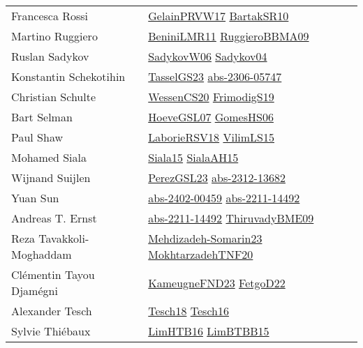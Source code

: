 {\begin{longtable}{p{4cm}p{20cm}}
Francesca Rossi & \href{papers/GelainPRVW17.pdf}{GelainPRVW17}\cite{GelainPRVW17} \href{articles/BartakSR10.pdf}{BartakSR10}\cite{BartakSR10} \\
Martino Ruggiero & \href{articles/BeniniLMR11.pdf}{BeniniLMR11}\cite{BeniniLMR11} \href{articles/RuggieroBBMA09.pdf}{RuggieroBBMA09}\cite{RuggieroBBMA09} \\
Ruslan Sadykov & \href{}{SadykovW06}\cite{SadykovW06} \href{papers/Sadykov04.pdf}{Sadykov04}\cite{Sadykov04} \\
Konstantin Schekotihin & \href{papers/TasselGS23.pdf}{TasselGS23}\cite{TasselGS23} \href{articles/abs-2306-05747.pdf}{abs-2306-05747}\cite{abs-2306-05747} \\
Christian Schulte & \href{papers/WessenCS20.pdf}{WessenCS20}\cite{WessenCS20} \href{papers/FrimodigS19.pdf}{FrimodigS19}\cite{FrimodigS19} \\
Bart Selman & \href{papers/HoeveGSL07.pdf}{HoeveGSL07}\cite{HoeveGSL07} \href{papers/GomesHS06.pdf}{GomesHS06}\cite{GomesHS06} \\
Paul Shaw & \href{articles/LaborieRSV18.pdf}{LaborieRSV18}\cite{LaborieRSV18} \href{papers/VilimLS15.pdf}{VilimLS15}\cite{VilimLS15} \\
Mohamed Siala & \href{articles/Siala15.pdf}{Siala15}\cite{Siala15} \href{papers/SialaAH15.pdf}{SialaAH15}\cite{SialaAH15} \\
Wijnand Suijlen & \href{papers/PerezGSL23.pdf}{PerezGSL23}\cite{PerezGSL23} \href{articles/abs-2312-13682.pdf}{abs-2312-13682}\cite{abs-2312-13682} \\
Yuan Sun & \href{articles/abs-2402-00459.pdf}{abs-2402-00459}\cite{abs-2402-00459} \href{articles/abs-2211-14492.pdf}{abs-2211-14492}\cite{abs-2211-14492} \\
Andreas T. Ernst & \href{articles/abs-2211-14492.pdf}{abs-2211-14492}\cite{abs-2211-14492} \href{papers/ThiruvadyBME09.pdf}{ThiruvadyBME09}\cite{ThiruvadyBME09} \\
Reza Tavakkoli{-}Moghaddam & \href{papers/Mehdizadeh-Somarin23.pdf}{Mehdizadeh-Somarin23}\cite{Mehdizadeh-Somarin23} \href{}{MokhtarzadehTNF20}\cite{MokhtarzadehTNF20} \\
Cl{\'{e}}mentin Tayou Djam{\'{e}}gni & \href{papers/KameugneFND23.pdf}{KameugneFND23}\cite{KameugneFND23} \href{articles/FetgoD22.pdf}{FetgoD22}\cite{FetgoD22} \\
Alexander Tesch & \href{papers/Tesch18.pdf}{Tesch18}\cite{Tesch18} \href{papers/Tesch16.pdf}{Tesch16}\cite{Tesch16} \\
Sylvie Thi{\'{e}}baux & \href{papers/LimHTB16.pdf}{LimHTB16}\cite{LimHTB16} \href{papers/LimBTBB15.pdf}{LimBTBB15}\cite{LimBTBB15} \\

\end{longtable}}
